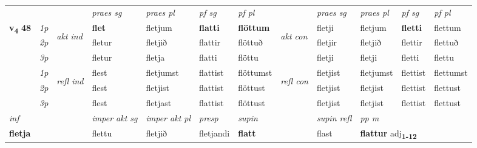 \begin{longtable}[l]{X>{\footnotesize\itshape}llXXXXlXXXX}
 & &   & \textit{praes sg}  & \textit{praes pl}    & \textit{ pf sg} & \textit{pf pl} & & \textit{praes sg}  & \textit{praes pl}    & \textit{pf sg} & \textit{pf pl }  \\ \cmidrule{4-7} \cmidrule{9-12}
 \multirow{2}{*}{{{\textbf{v{\textsubscript{4}}} \Large{\textbf{48}}}}}  & 1p & \multirow{3}{*}{\begin{turn}{90}\textit{akt ind}\end{turn}} & \textbf{flet} & fletjum & \textbf{flatti} & \textbf{flöttum} & \multirow{3}{*}{\begin{turn}{90}\textit{akt con}\end{turn}} &fletji & fletjum & \textbf{fletti} & flettum\\*
 & 2p &  &  fletur  & fletjið & flattir & flöttuð & & fletjir & fletjið & flettir & flettuð \\*
 & 3p &  & fletur & fletja & flatti & flöttu & & fletji & fletji& fletti & flettu \\*
\cmidrule{4-7} \cmidrule{9-12}
 & 1p & \multirow{3}{*}{\begin{turn}{90}\textit{refl ind}\end{turn}}  & flest & fletjumst & flattist & flöttumst & \multirow{3}{*}{\begin{turn}{90}\textit{refl con}\end{turn}}  &fletjist & fletjumst & flettist & flettumst \\*
 & 2p &  & flest & fletjist & flattist & flöttust & &fletjist & fletjist & flettist & flettust \\*
 & 3p  & & flest & fletjast & flattist & flöttust & & fletjist & fletjist& flettist & flettust \\*
\cmidrule{4-7} \cmidrule{9-12}

   {\textit{inf}} & &  & \textit{imper akt sg} & \textit{imper akt pl}   & \textit{presp} & \textit{supin} && \textit{supin refl} & \textit{pp m} \\*
  {\textbf{fletja}} & && flettu  & fletjið   & fletjandi &  \textbf{flatt} && flast & \multicolumn{2}{l}{\textbf{flattur} adj\textbf{\textsubscript{1-12}}} \\*

\midrule


\end{longtable}
